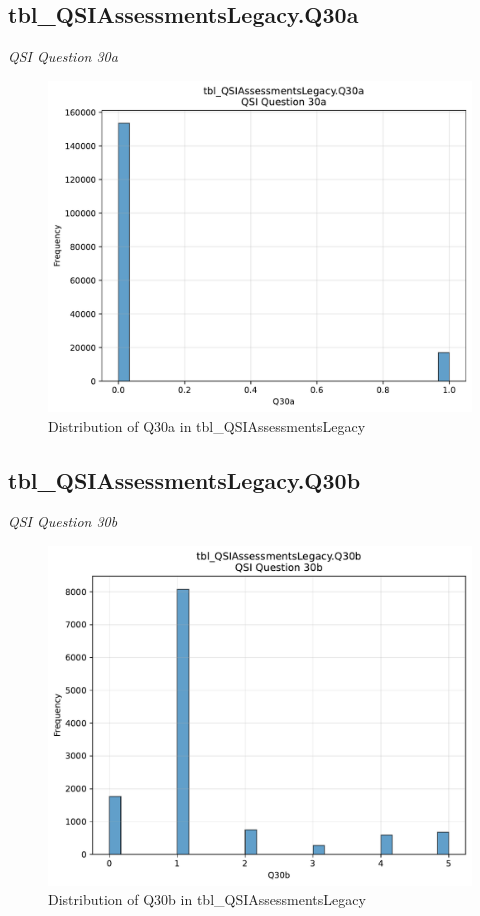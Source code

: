\subsection{tbl\_QSIAssessmentsLegacy.Q30a}
\textit{QSI Question 30a}

\begin{figure}[htbp]
\centering
\includegraphics[width=\textwidth]{figures/dbo_tbl_QSIAssessmentsLegacy_Q30a.pdf}
\caption{Distribution of Q30a in tbl\_QSIAssessmentsLegacy}
\end{figure}\newpage

\subsection{tbl\_QSIAssessmentsLegacy.Q30b}
\textit{QSI Question 30b}

\begin{figure}[htbp]
\centering
\includegraphics[width=\textwidth]{figures/dbo_tbl_QSIAssessmentsLegacy_Q30b.pdf}
\caption{Distribution of Q30b in tbl\_QSIAssessmentsLegacy}
\end{figure}\newpage

